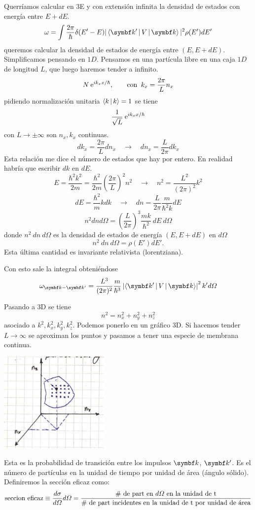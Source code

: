 \documentclass[10pt,oneside]{CBFT_book}
\begin{document}
Querríamos calcular en 3E y con extensión infinita la densidad de estados con energía entre $E +dE$.
\[
	\omega = \int \frac{2\pi}{\hbar}  \delta(E'-E) |\Braket{\vb{k}'|V|\vb{k}}|^2 \rho(E') dE'
\]
queremos calcular la densidad de estados de energía entre $(E,E+dE)$. 
Simplificamos pensando en $1D$. Pensamos en una partícula libre en una caja $1D$ de longitud $L$, que
luego haremos tender a infinito.
\[
	N \:\mathrm{e}^{i k_x x /\hbar}, \qquad \text{con} \;\; k_x = \frac{2\pi}{L}n_x
\]
pidiendo normalización unitaria $\Braket{k|k}=1$ se tiene 
\[
	\frac{1}{\sqrt{L}} \:\mathrm{e}^{i k_x x /\hbar}
\]
con $L\to\pm\infty$ son $n_x,k_x$ continuas.
\[
	dk_x = \frac{2\pi}{L} dn_x \quad \longrightarrow \quad  dn_x = \frac{L}{2\pi} dk_x 
\]
Esta relación me dice el número de estados que hay por entero. 
En realidad habría que escribir $dk$ en $dE$.
\[
	E = \frac{\hbar^2k^2}{2m} = \frac{\hbar^2}{2m} \left( \frac{2\pi}{L}\right)^2 n^2 \quad 
	\longrightarrow \quad n^2 = \frac{L^2}{(2\pi)^2}k^2
\]
\[
	dE = \frac{\hbar^2}{m} k dk \quad \longrightarrow \quad dn = \frac{L}{2\pi}\frac{m}{\hbar^2 k} dE
\]
\[
	n^2 dn d\Omega = \left( \frac{L}{2\pi} \right)^3 \frac{mk}{\hbar^2} \:dE \:d\Omega
\]
donde $n^2\:dn\:d\Omega$ es la densidad de estados de energía $(E,E+dE)$ en $d\Omega$
\[
	n^2 \: dn \: d\Omega = \rho(E') dE'.
\]
Esta última cantidad es invariante relativista (lorentziana).

Con esto sale la integral obteniéndose
\[
	\omega_{\vb{k}-\vb{k}'} = 
	\frac{L^3}{(2\pi)^2} \frac{m}{\hbar^3} \left|\Braket{\vb{k}'|V|\vb{k}}\right|^2 k'd\Omega
\]

Pasando a 3D se tiene
\[
	n^2 = n_x^2 + n_y^2 + n_z^2
\]
asociado a $k^2, k_x^2, k_y^2, k_z^2$. Podemos ponerlo en un gráfico 3D. Si hacemos tender $L \to \infty$
se aproximan los puntos y pasamos a tener una especie de membrana continua.

\includegraphics[width=0.4\textwidth]{images/fig_ft2_scattering_section_2.jpg}

Esta es la probabilidad de transición entre los impulsos $\vb{k}$, $\vb{k}'$. Es el número de partículas en 
la unidad de tiempo por unidad de área (ángulo sólido).
Definiremos la sección eficaz como:
\[
	\text{seccion eficaz} \equiv \frac{d^{\hspace{-0.05em}} {\sigma}}{d {\Omega}^{\hspace{-0.05em}}}d\Omega =
	\frac{\text{\# de part en $d\Omega$ en la unidad de t}}
	{\text{\# de part incidentes en la unidad de t por unidad de área}}
\]
\end{document}
